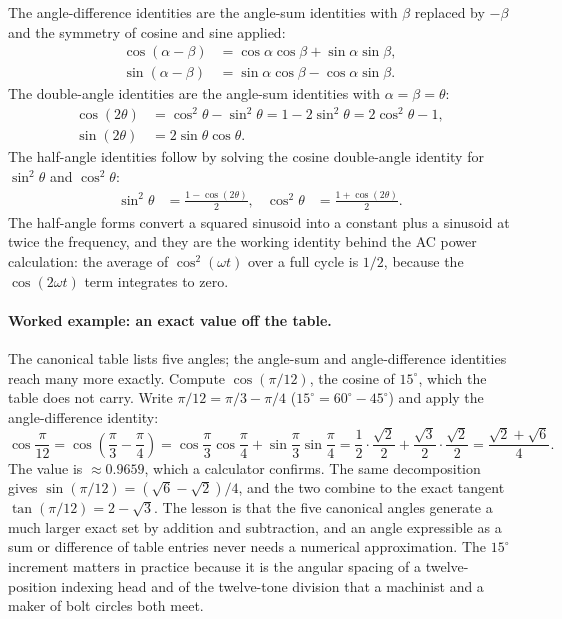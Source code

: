 The angle-difference identities are the angle-sum identities with
$\beta$ replaced by $-\beta$ and the symmetry of cosine and sine
applied:
\begin{align*}
\cos(\alpha - \beta) &= \cos\alpha\cos\beta + \sin\alpha\sin\beta, \\
\sin(\alpha - \beta) &= \sin\alpha\cos\beta - \cos\alpha\sin\beta.
\end{align*}
The double-angle identities are the angle-sum identities with
$\alpha = \beta = \theta$:
\begin{align*}
\cos(2\theta) &= \cos^{2}\theta - \sin^{2}\theta = 1 - 2\sin^{2}\theta = 2\cos^{2}\theta - 1, \\
\sin(2\theta) &= 2\sin\theta\cos\theta.
\end{align*}
The half-angle identities follow by solving the cosine
double-angle identity for $\sin^{2}\theta$ and $\cos^{2}\theta$:
\begin{align*}
\sin^{2}\theta &= \frac{1 - \cos(2\theta)}{2}, &
\cos^{2}\theta &= \frac{1 + \cos(2\theta)}{2}.
\end{align*}
The half-angle forms convert a squared sinusoid into a constant
plus a sinusoid at twice the frequency, and they are the working
identity behind the AC power calculation: the average of
$\cos^{2}(\omega t)$ over a full cycle is $1/2$, because the
$\cos(2\omega t)$ term integrates to zero.

\paragraph{Worked example: an exact value off the table.} The canonical
table lists five angles; the angle-sum and angle-difference identities
reach many more exactly. Compute $\cos(\pi/12)$, the cosine of
$15^{\circ}$, which the table does not carry. Write $\pi/12 = \pi/3 -
\pi/4$ ($15^{\circ} = 60^{\circ} - 45^{\circ}$) and apply the
angle-difference identity:
\[
\cos\frac{\pi}{12} = \cos\!\left(\frac{\pi}{3} - \frac{\pi}{4}\right)
= \cos\frac{\pi}{3}\cos\frac{\pi}{4} + \sin\frac{\pi}{3}\sin\frac{\pi}{4}
= \frac{1}{2}\cdot\frac{\sqrt 2}{2} + \frac{\sqrt 3}{2}\cdot\frac{\sqrt 2}{2}
= \frac{\sqrt 2 + \sqrt 6}{4}.
\]
The value is $\approx 0.9659$, which a calculator confirms. The same
decomposition gives $\sin(\pi/12) = (\sqrt 6 - \sqrt 2)/4$, and the two
combine to the exact tangent $\tan(\pi/12) = 2 - \sqrt 3$. The lesson
is that the five canonical angles generate a much larger exact set by
addition and subtraction, and an angle expressible as a sum or
difference of table entries never needs a numerical approximation. The
$15^{\circ}$ increment matters in practice because it is the angular
spacing of a twelve-position indexing head and of the twelve-tone
division that a machinist and a maker of bolt circles both meet.

